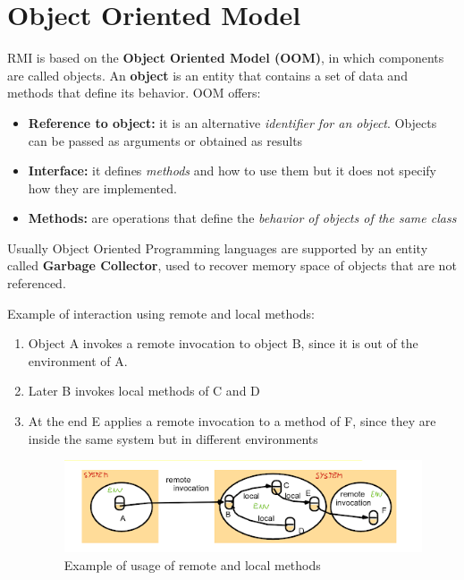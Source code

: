 \section{Object Oriented Model}
RMI is based on the \textbf{Object Oriented Model (OOM)}, in which components are called objects. An \textbf{object} is an entity that contains a set of data and methods that define its behavior.
OOM offers:
\begin{itemize}
    \item \textbf{Reference to object:} it is an alternative \textit{identifier for an object}. Objects can be passed as arguments or obtained as results
    \item \textbf{Interface:} it defines \textit{methods} and how to use them but it does not specify how they are implemented.
    \item \textbf{Methods:} are operations that define the \textit{behavior of objects of the same class}
\end{itemize}
Usually Object Oriented Programming languages are supported by an entity called \textbf{Garbage Collector}, used to recover memory space of objects that are not referenced.

Example of interaction using remote and local methods:
\begin{enumerate}
    \item Object A invokes a remote invocation to object B, since it is out of the environment of A.
    \item Later B invokes local methods of C and D
    \item At the end E applies a remote invocation to a method of F, since they are inside the same system but in different environments
    
    \begin{figure}[!h]
            \centering
            \includegraphics[width=.7\linewidth]{images/InterprocessCommunication/exampleOOP.png}
            \caption{Example of usage of remote and local methods}
    \end{figure}
    
\end{enumerate}

